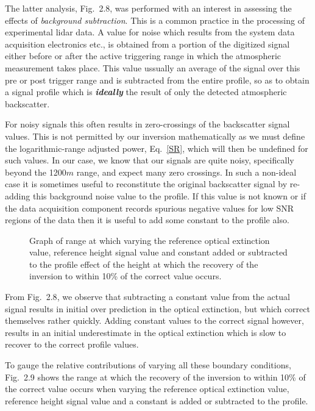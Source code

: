 The latter analysis, Fig.~{2.8}, 
was performed with an interest in assessing the
effects of {\em background subtraction}. 
This is a common practice
in the processing of experimental lidar data. A value for noise 
which results from the system data acquisition electronics etc.,
is obtained from a portion of the digitized signal either before
or after the active triggering range in which the atmospheric 
measurement takes place. This value ussually an average of the
signal over this pre or post trigger range and is subtracted
from the entire profile, so as to obtain a signal profile which
is {\bf\em ideally} the result of only the detected atmospheric backscatter. 

For noisy signals this often results in zero-crossings of the
backscatter signal values. This is not permitted by our inversion 
mathematically as we must define the logarithmic-range adjusted
power, Eq.~{\ref{SR}}, which will then be undefined for such values. 
In our case, we know that our signals are quite noisy, specifically
beyond the 1200$m$ range, and expect many zero crossings. In such
a non-ideal case it is sometimes useful to reconstitute the 
original backscatter signal by re-adding this background noise value
to the profile. If this value is not known or if the data 
acquisition component records spurious negative values for low SNR
regions of the data then it is useful to add some constant
to the profile also.

\begin{figure}
\vspace{5.0in}
\caption{Graph of range at which varying 
the reference optical extinction value, reference height signal value 
and constant added or subtracted to the profile effect of the height 
at which the recovery of the inversion to within 10\% of the correct
value occurs.}
\end{figure}

From Fig.~{2.8}, we observe that subtracting a constant value from 
the actual signal results in initial over prediction in the optical
extinction, but which correct themselves rather quickly.
Adding constant values to the correct signal however, results 
in an initial underestimate in the optical extinction which 
is slow to recover to the correct profile values.

To gauge the relative contributions of varying all these boundary
conditions, Fig.~{2.9} shows the range at which the recovery of the 
inversion to within 10\% of the correct value occurs when varying 
the reference optical extinction value, reference height signal value 
and a constant is added or subtracted to the profile.

